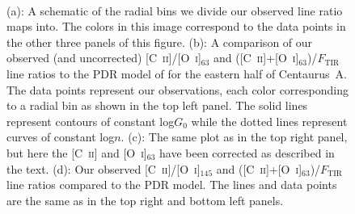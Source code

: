 \begin{figure}[!htbp]
\\
\caption[Observed line ratios for Centaurus~A compared to the parameter space of a PDR model using uncorrected and corrected observations] {(a): A schematic of the radial bins we divide our observed line ratio maps into.  The colors in this image correspond to the data points in the other three panels of this figure. (b): A comparison of our observed (and uncorrected) [C~\textsc{ii}]/[O~\textsc{i}]$_{63}$ and ([C~\textsc{ii}]+[O~\textsc{i}]$_{63}$)/$F_{\mathrm{TIR}}$ line ratios to the PDR model of \citet{1999ApJ...527..795K} for the eastern half of Centaurus~A. The data points represent our observations, each color corresponding to a radial bin as shown in the top left panel.  The solid lines represent contours of constant log$G_{0}$ while the dotted lines represent curves of constant log$n$.  (c): The same plot as in the top right panel, but here the [C~\textsc{ii}] and [O~\textsc{i}]$_{63}$ have been corrected as described in the text. (d): Our observed [C~\textsc{ii}]/[O~\textsc{i}]$_{145}$ and ([C~\textsc{ii}]+[O~\textsc{i}]$_{63}$)/$F_{\mathrm{TIR}}$ line ratios compared to the PDR model.  The lines and data points are the same as in the top right and bottom left panels.}
\label{fig:pdr_plots}
\end{figure}
